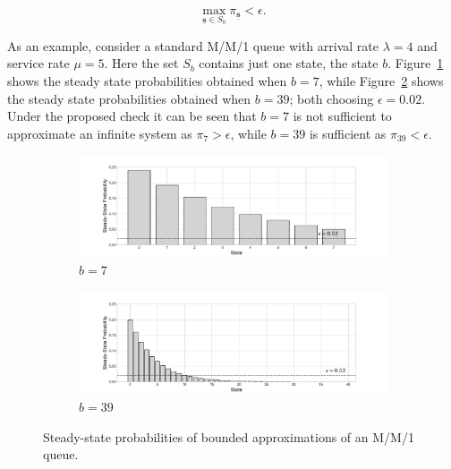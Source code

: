 \documentclass{article}
\begin{document}
\begin{equation}
\max_{\underline{\mathbf{s}} \in S_b} \pi_{\underline{\mathbf{s}}} < \epsilon.
\end{equation}

As an example, consider a standard M/M/1 queue with arrival rate $\lambda = 4$
and service rate $\mu = 5$.
Here the set $S_b$ contains just one state, the state $b$.
Figure~\ref{fig:ergodic_b7} shows the steady state probabilities obtained when
$b=7$, while Figure~\ref{fig:ergodic_b39} shows the steady state probabilities
obtained when $b=39$; both choosing $\epsilon=0.02$.
Under the proposed check it can be seen that $b=7$ is not sufficient to
approximate an infinite system as $\pi_7 > \epsilon$, while $b=39$ is sufficient
as $\pi_{39} < \epsilon$.

\begin{figure}[!htbp]
  \begin{center}
  \begin{subfigure}[b]{0.65\textwidth}
    \includegraphics[width=\textwidth]{img/example_mc_8states.pdf}
    \caption{$b=7$}
    \label{fig:ergodic_b7}
  \end{subfigure}
  \begin{subfigure}[b]{0.65\textwidth}
    \includegraphics[width=\textwidth]{img/example_mc_40states.pdf}
    \caption{$b=39$}
    \label{fig:ergodic_b39}
  \end{subfigure}
  \end{center}
  \caption{Steady-state probabilities of bounded approximations of an M/M/1
  queue.}
  \label{fig:ergodic_check}
\end{figure}
\end{document}
